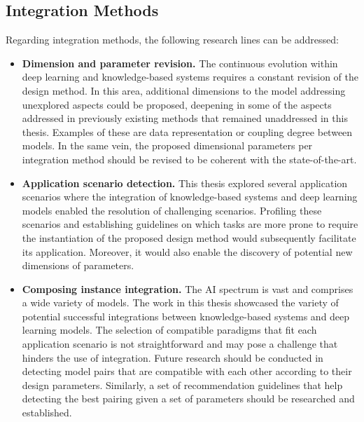 \subsection*{Integration Methods}
Regarding integration methods, the following research lines can be addressed:
\begin{itemize}
    \item \textbf{Dimension and parameter revision.} The continuous evolution within deep learning and knowledge-based systems requires a constant revision of the design method. In this area, additional dimensions to the model addressing unexplored aspects could be proposed, deepening in some of the aspects addressed in previously existing methods that remained unaddressed in this thesis. Examples of these are data representation or coupling degree between models. In the same vein, the proposed dimensional parameters per integration method should be revised to be coherent with the state-of-the-art. 
    
    \item \textbf{Application scenario detection.} This thesis explored several application scenarios where the integration of knowledge-based systems and deep learning models enabled the resolution of challenging scenarios. Profiling these scenarios and establishing guidelines on which tasks are more prone to require the instantiation of the proposed design method would subsequently facilitate its application. Moreover, it would also enable the discovery of potential new dimensions of parameters. 
    
    \item \textbf{Composing instance integration.} The AI spectrum is vast and comprises a wide variety of models. The work in this thesis showcased the variety of potential successful integrations between knowledge-based systems and deep learning models. The selection of compatible paradigms that fit each application scenario is not straightforward and may pose a challenge that hinders the use of integration. Future research should be conducted in detecting model pairs that are compatible with each other according to their design parameters. Similarly, a set of recommendation guidelines that help detecting the best pairing given a set of parameters should be researched and established.
\end{itemize}


